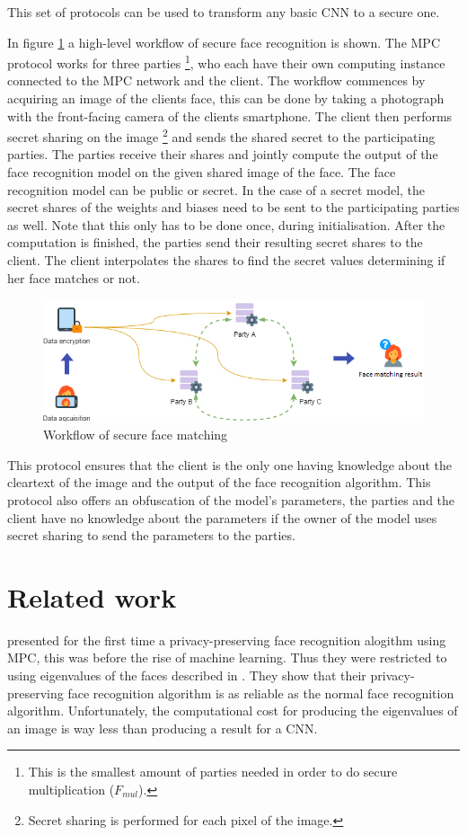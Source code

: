 This set of protocols can be used to transform any basic CNN to a secure one.

In figure \ref{fig:workflow} a high-level workflow of secure face recognition is shown. The MPC protocol works for three parties \footnote{This is the smallest amount of parties needed in order to do secure multiplication ($F_{mul}$).}, who each have their own computing instance connected to the MPC network and the client. The workflow commences by acquiring an image of the clients face, this can be done by taking a photograph with the front-facing camera of the clients smartphone. The client then performs secret sharing on the image \footnote{Secret sharing is performed for each pixel of the image.} and sends the shared secret to the participating parties. The parties receive their shares and jointly compute the output of the face recognition model on the given shared image of the face. The face recognition model can be public or secret. In the case of a secret model, the secret shares of the weights and biases need to be sent to the participating parties as well. Note that this only has to be done once, during initialisation. After the computation is finished, the parties send their resulting secret shares to the client. The client interpolates the shares to find the secret values determining if her face matches or not.

\begin{figure}[H]
  \includegraphics[width=\linewidth]{fig/workflow.png}
  \caption{Workflow of secure face matching}
  \label{fig:workflow}
\end{figure}

This protocol ensures that the client is the only one having knowledge about the cleartext of the image and the output of the face recognition algorithm. This protocol also offers an obfuscation of the model's parameters, the parties and the client have no knowledge about the parameters if the owner of the model uses secret sharing to send the parameters to the parties.

\section{Related work}
\cite{erkin2009privacy} presented for the first time a privacy-preserving face recognition alogithm using MPC, this was before the rise of machine learning. Thus they were restricted to using eigenvalues of the faces described in \cite{turk1991face}. They show that their privacy-preserving face recognition algorithm is as reliable as the normal face recognition algorithm. Unfortunately, the computational cost for producing the eigenvalues of an image is way less than producing a result for a CNN.

